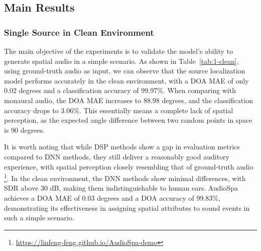 \documentclass{IEEEtran}
\begin{document}
\subsection{Main Results}
\subsubsection{Single Source in Clean Environment}
\begin{table}[t]
    \centering
    \caption{Results on the single-source data, where the environment is clean.}
    \label{tab:1-clean}%
  \end{table}%

The main objective of the experiments is to validate the model's ability to generate spatial audio in a simple scenario. As shown in Table~\ref{tab:1-clean}, using ground-truth audio as input, we can observe that the source localization model performs accurately in the clean environment, with a DOA MAE of only 0.02 degrees and a classification accuracy of 99.97\%. When comparing with monaural audio, the DOA MAE increases to 88.98 degrees, and the classification accuracy drops to 3.06\%. This essentially means a complete lack of spatial perception, as the expected angle difference between two random points in space is 90 degrees.

It is worth noting that while DSP methods show a gap in evaluation metrics compared to DNN methods, they still deliver a reasonably good auditory experience, with spatial perception closely resembling that of ground-truth audio \footnote{\href{https://linfeng-feng.github.io/AudioSpa-demo}{https://linfeng-feng.github.io/AudioSpa-demo}}. In the clean environment, the DNN methods show minimal differences, with SDR above 30 dB, making them indistinguishable to human ears. AudioSpa achieves a DOA MAE of 0.03 degrees and a DOA accuracy of 99.83\%, demonstrating its effectiveness in assigning spatial attributes to sound events in such a simple scenario.
\end{document}
